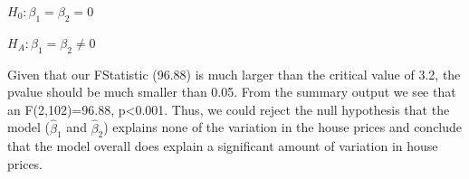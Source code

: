 \documentclass[]{article}
\begin{document}
\(H_0: \beta_1=\beta_2=0\)

\(H_A: \beta_1=\beta_2 \ne 0\)

Given that our FStatistic (96.88) is much larger than the critical value
of 3.2, the pvalue should be much smaller than 0.05. From the summary
output we see that an F(2,102)=96.88, p\textless{}0.001. Thus, we could
reject the null hypothesis that the model (\(\hat\beta_1\) and
\(\hat\beta_2\)) explains none of the variation in the house prices and
conclude that the model overall does explain a significant amount of
variation in house prices.
\end{document}
